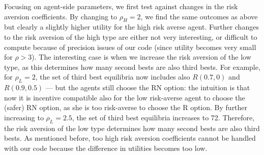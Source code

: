 Focusing on agent-side parameters, we first test against changes in the risk aversion coefficients. By changing to $\rho_H = 2$, we find the same outcomes as above but clearly a slightly higher utility for the high risk averse agent. Further changes to the risk aversion of the high type are either not very interesting, or difficult to compute because of precision issues of our code (since utility becomes very small for $\rho > 3$). The interesting case is when we increase the risk aversion of the low type, as this determines how many second bests are also third bests. For example, for $\rho_L=2$, the set of third best equilibria now includes also $R(0.7,0)$ and $R(0.9,0.5)$ --- but the agents still choose the RN option: the intuition is that now it is incentive compatible also for the low risk-averse agent to choose the (safer) RN option, as she is too risk-averse to choose the R option. By further increasing to $\rho_L=2.5$, the set of third best equilibria increases to 72. Therefore, the risk aversion of the low type determines how many second bests are also third bests. As mentioned before, too high risk aversion coefficients cannot be handled with our code because the difference in utilities becomes too low.
